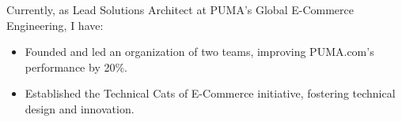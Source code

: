 \begin{itemize}



\end{itemize}

\vspace{2ex}

Currently, as Lead Solutions Architect at PUMA’s Global E-Commerce Engineering, I have:


\begin{itemize}

\item Founded and led an organization of two teams, improving PUMA.com’s performance by 20\%.
\item Established the Technical Cats of E-Commerce initiative, fostering technical design and innovation.

\end{itemize}



